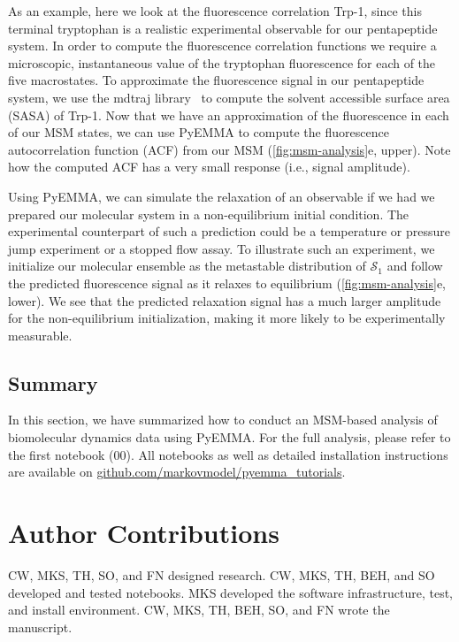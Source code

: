 \documentclass[9pt,tutorial]{livecoms}
\newcommand{\githubrepository}{\url{github.com/markovmodel/pyemma_tutorials}}
\begin{document}
As an example, here we look at the fluorescence correlation Trp-1, since this terminal tryptophan is a realistic experimental observable for our pentapeptide system.
In order to compute the fluorescence correlation functions we require a microscopic, instantaneous value of the tryptophan fluorescence for each of the five macrostates.
To approximate the fluorescence signal in our pentapeptide system, we use the mdtraj library~\cite{mdtraj} to compute the solvent accessible surface area (SASA) of Trp-1.
Now that we have an approximation of the fluorescence in each of our MSM states, we can use PyEMMA to compute the fluorescence autocorrelation function (ACF) from our MSM (\ref{fig:msm-analysis}e, upper).
Note how the computed ACF has a very small response (i.e., signal amplitude).

Using PyEMMA, we can simulate the relaxation of an observable if we had we prepared our molecular system in a non-equilibrium initial condition.
The experimental counterpart of such a prediction could be a temperature or pressure jump experiment or a stopped flow assay.
To illustrate such an experiment, we initialize our molecular ensemble as the metastable distribution of $\mathcal{S}_1$ and follow the predicted fluorescence signal as it relaxes to equilibrium (\ref{fig:msm-analysis}e, lower).
We see that the predicted relaxation signal has a much larger amplitude for the non-equilibrium initialization, making it more likely to be experimentally measurable.

\subsection{Summary}

In this section, we have summarized how to conduct an MSM-based analysis of biomolecular dynamics data using PyEMMA. For the full analysis, please refer to the first notebook (00). All notebooks as well as detailed installation instructions are available on \githubrepository{}.

\section{Author Contributions}
%
CW, MKS, TH, SO, and FN designed research.
CW, MKS, TH, BEH, and SO developed and tested notebooks.
MKS developed the software infrastructure, test, and install environment.
CW, MKS, TH, BEH, SO, and FN wrote the manuscript.
\end{document}
